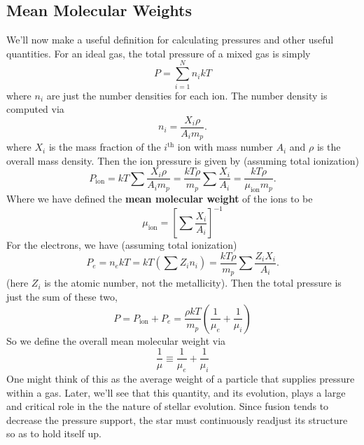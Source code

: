 \documentclass[10pt]{article}
\numberwithin{equation}{section}
\begin{document}
	\subsection{Mean Molecular Weights}
	We'll now make a useful definition for calculating pressures and other useful quantities. For an ideal gas, the total pressure of a mixed gas is simply
	\begin{equation}
		\label{mmw.1} P=\sum_{i=1}^N n_ikT
	\end{equation}
	where $n_i$ are just the number densities for each ion. The number density is computed via
	\begin{equation}
		\label{mmw.2} n_i=\frac{X_i\rho}{A_im_p}.
	\end{equation}
	where $X_i$ is the mass fraction of the $i^{\mathrm{th}}$ ion with mass number $A_i$ and $\rho$ is the overall mass density. Then the ion pressure is given by (assuming total ionization)
	\begin{equation}
		\label{mmw.3} P_{\mathrm{ion}}=kT\sum\frac{X_i\rho}{A_im_p}=\frac{kT\rho}{m_p}\sum\frac{X_i}{A_i}=\frac{kT\rho}{\mu_{\mathrm{ion}}m_p}.
	\end{equation}
	Where we have defined the \textbf{mean molecular weight} of the ions to be
	\begin{equation}
		\label{mmw.3a} \mu_{\mathrm{ion}}=\left[\sum\frac{X_i}{A_i}\right]^{-1}
	\end{equation}
	For the electrons, we have (assuming total ionization)
	\begin{equation}
		\label{mmw.4} P_e=n_ekT=kT\left(\sum Z_in_i\right)=\frac{kT\rho}{m_p}\sum\frac{Z_iX_i}{A_i}.
	\end{equation}
	(here $Z_i$ is the atomic number, not the metallicity). Then the total pressure is just the sum of these two,
	\begin{equation}
		\label{mmw.5} P=P_{\mathrm{ion}}+P_e=\frac{\rho kT}{m_p}\left(\frac{1}{\mu_e}+\frac{1}{\mu_i}\right)
	\end{equation}
	So we define the overall mean molecular weight via
	\begin{equation}
		\frac{1}{\mu}\equiv \frac{1}{\mu_e}+\frac{1}{\mu_i}
	\end{equation}
	One might think of this as the average weight of a particle that supplies pressure within a gas. Later, we'll see that this quantity, and its evolution, plays a large and critical role in the the nature of stellar evolution. Since fusion tends to decrease the pressure support, the star must continuously readjust its structure so as to hold itself up.\\
	
\end{document}
